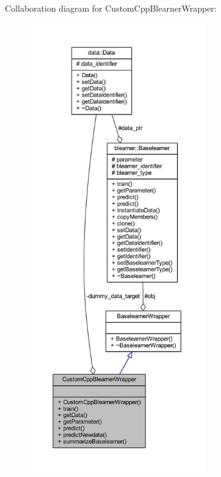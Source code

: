 Collaboration diagram for Custom\+Cpp\+Blearner\+Wrapper\+:\nopagebreak
\begin{figure}[H]
\begin{center}
\leavevmode
\includegraphics[height=550pt]{class_custom_cpp_blearner_wrapper__coll__graph}
\end{center}
\end{figure}
